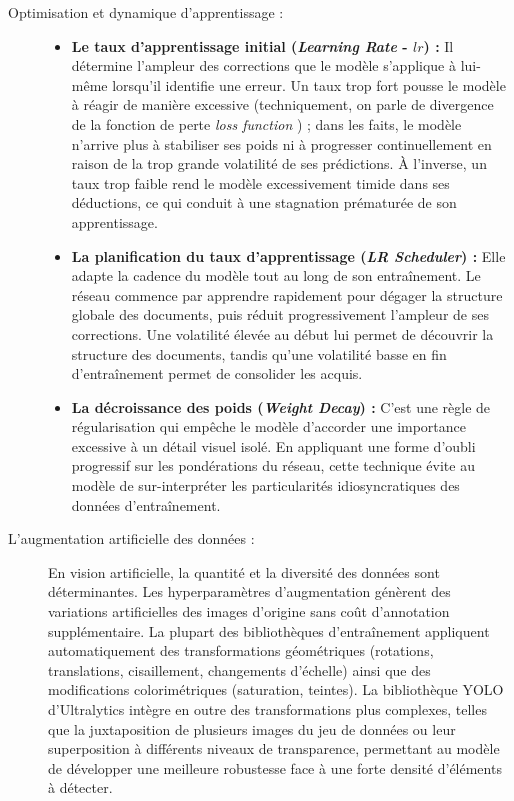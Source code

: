 \begin{description}
	\item[Optimisation et dynamique d'apprentissage :]\hfill
	\begin{itemize}
		\item \textbf{Le taux d'apprentissage initial (\textit{Learning Rate} - $lr$) :} Il détermine l'ampleur des corrections que le modèle s'applique à lui-même lorsqu'il identifie une erreur. Un taux trop fort pousse le modèle à réagir de manière excessive (techniquement, on parle de \og divergence de la fonction de perte \/\textit{loss function}\/ \fg) ; dans les faits, le modèle n'arrive plus à stabiliser ses poids ni à progresser continuellement en raison de la trop grande volatilité de ses prédictions. À l'inverse, un taux trop faible rend le modèle excessivement timide dans ses déductions, ce qui conduit à une stagnation prématurée de son apprentissage.
		\item \textbf{La planification du taux d'apprentissage (\textit{LR Scheduler}) :} Elle adapte la cadence du modèle tout au long de son entraînement. Le réseau commence par apprendre rapidement pour dégager la structure globale des documents, puis réduit progressivement l'ampleur de ses corrections. Une volatilité élevée au début lui permet de découvrir la structure des documents, tandis qu'une volatilité basse en fin d'entraînement permet de consolider les acquis.
		\item \textbf{La décroissance des poids (\textit{Weight Decay}) :} C'est une règle de régularisation qui empêche le modèle d'accorder une importance excessive à un détail visuel isolé. En appliquant une forme d'oubli progressif sur les pondérations du réseau, cette technique évite au modèle de sur-interpréter les particularités idiosyncratiques des données d'entraînement.
	\end{itemize}
	
	\item[L'augmentation artificielle des données :]\hfill
	En vision artificielle, la quantité et la diversité des données sont déterminantes. Les hyperparamètres d'augmentation génèrent des variations artificielles des images d'origine sans coût d'annotation supplémentaire. La plupart des bibliothèques d'entraînement appliquent automatiquement des transformations géométriques (rotations, translations, cisaillement, changements d'échelle) ainsi que des modifications colorimétriques (saturation, teintes). La bibliothèque YOLO d'Ultralytics intègre en outre des transformations plus complexes, telles que la juxtaposition de plusieurs images du jeu de données ou leur superposition à différents niveaux de transparence, permettant au modèle de développer une meilleure robustesse face à une forte densité d'éléments à détecter.
	

\end{description}
